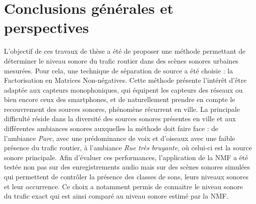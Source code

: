 \chapter*{Conclusions générales et perspectives}
\label{chap:concl}


L'objectif de ces travaux de thèse a été de proposer une méthode permettant de déterminer le niveau sonore du trafic routier dans des scènes sonores urbaines mesurées. Pour cela, une technique de séparation de source a été choisie : la Factorisation en Matrices Non-négatives.
Cette méthode présente l'intérêt d'être adaptée aux capteurs monophoniques, qui équipent les capteurs des réseaux ou bien encore ceux des smartphones, et de naturellement prendre en compte le recouvrement des sources sonores, phénomène récurrent en ville. 
La principale difficulté réside dans la diversité des sources sonores présentes en ville et aux différentes ambiances sonores auxquelles la méthode doit faire face : de l'ambiance \textit{Parc}, avec une prédominance de voix et d'oiseaux avec une faible présence du trafic routier, à l'ambiance \textit{Rue très bruyante}, où celui-ci est la source sonore principale.
Afin d'évaluer ces performances, l'application de la NMF a été testée non pas sur des enregistrements audio mais sur des scènes sonores simulées qui permettent de contrôler la présence des classes de sons, leurs niveaux sonores et leur occurrence. Ce choix a notamment permis de connaitre le niveau sonore du trafic exact qui est ainsi comparé au niveau sonore estimé par la NMF. 


